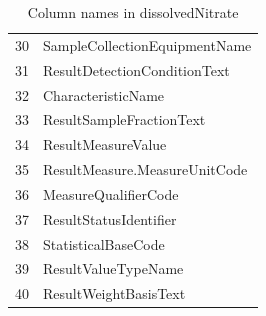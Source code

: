 \documentclass[a4paper,11pt]{article}\usepackage[]{graphicx}\usepackage[]{color}
\begin{document}
\begin{table}[ht]
\begin{tabular}{rl}
  30 & SampleCollectionEquipmentName \\ 
  31 & ResultDetectionConditionText \\ 
  32 & CharacteristicName \\ 
  33 & ResultSampleFractionText \\ 
  34 & ResultMeasureValue \\ 
  35 & ResultMeasure.MeasureUnitCode \\ 
  36 & MeasureQualifierCode \\ 
  37 & ResultStatusIdentifier \\ 
  38 & StatisticalBaseCode \\ 
  39 & ResultValueTypeName \\ 
  40 & ResultWeightBasisText \\ 
   \hline
\end{tabular}
\caption{Column names in dissolvedNitrate} 
\end{table}



\FloatBarrier
\end{document}
